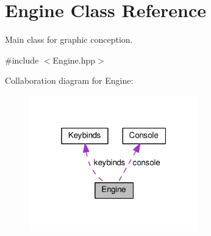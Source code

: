 \hypertarget{classEngine}{}\section{Engine Class Reference}
\label{classEngine}


Main class for graphic conception.  




{\ttfamily \#include $<$Engine.\+hpp$>$}



Collaboration diagram for Engine\+:\nopagebreak
\begin{figure}[H]
\begin{center}
\leavevmode
\includegraphics[width=208pt]{classEngine__coll__graph}
\end{center}
\end{figure}
